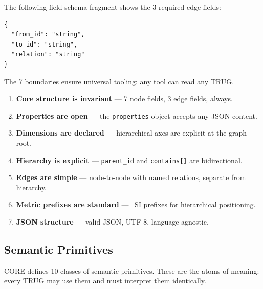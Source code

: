 \documentclass{article}
\begin{document}
The following field-schema fragment shows the 3 required edge fields:

\begin{lstlisting}[style=jsonfragment]
{
  "from_id": "string",
  "to_id": "string",
  "relation": "string"
}
\end{lstlisting}

The 7 boundaries ensure universal tooling: any tool can read any TRUG.

\begin{enumerate}
    \item \textbf{Core structure is invariant} --- 7 node fields, 3 edge fields, always.
    \item \textbf{Properties are open} --- the \texttt{properties} object accepts any JSON content.
    \item \textbf{Dimensions are declared} --- hierarchical axes are explicit at the graph root.
    \item \textbf{Hierarchy is explicit} --- \texttt{parent\_id} and \texttt{contains[]} are bidirectional.
    \item \textbf{Edges are simple} --- node-to-node with named relations, separate from hierarchy.
    \item \textbf{Metric prefixes are standard} --- \VocabLevelPrefixes\ SI prefixes for hierarchical positioning.
    \item \textbf{JSON structure} --- valid JSON, UTF-8, language-agnostic.
\end{enumerate}

\subsection{Semantic Primitives}

CORE defines 10 classes of semantic primitives. These are the atoms of meaning: every TRUG may use them and must interpret them identically.
\end{document}
